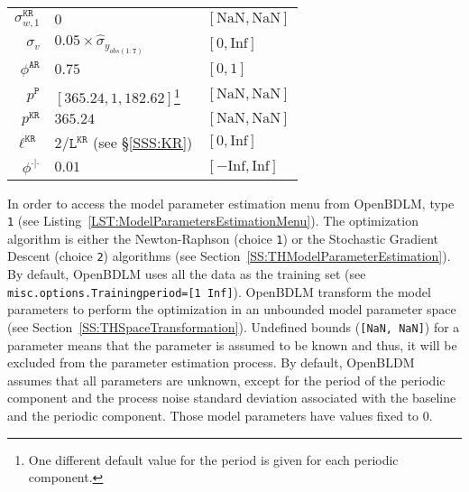 \begin{table}[h!]
\begin{tabular}{r|ll}
$\sigma_{w,1}^{\mathtt{KR}}  $ &  $0$  &  $[\text{NaN},\text{NaN}]$ \\
$\sigma_{v}$ &  $0.05\times\hat{\sigma}_{y_{obs(1:\mathtt{T})}}$  &  $[0,\text{Inf}]$ \\
$\phi^{\mathtt{AR}} $ &  $0.75$ & $[0,1]$ \\
$p^{\mathtt{P}} $ &  $[365.24, 1, 182.62]$\footnote{One different default value for the period is given for each periodic component.} & $[\text{NaN},\text{NaN}]$ \\
$p^{\mathtt{KR}} $ &  $365.24$ & $[\text{NaN},\text{NaN}]$ \\
$\ell^{\mathtt{KR}} $ &  $2/\mathtt{L}^{\mathtt{KR}}$ (see \S\ref{SSS:KR})& $[0,\text{Inf}]$ \\
$\phi^{\cdot|\cdot} $ &  $0.01$  &  $[-\text{Inf}, \text{Inf}]$\\\hline
\end{tabular}
\label{table:defaultparamreal}
\end{table}



In order to access the model parameter estimation menu from OpenBDLM, type  \colorbox{light-gray}{\lstinline[basicstyle = \mlttfamily \small, backgroundcolor = \color{light-gray}]!1!} (see Listing~\ref{LST:ModelParametersEstimationMenu}).
The optimization algorithm is either the Newton-Raphson (choice \colorbox{light-gray}{\lstinline[basicstyle = \mlttfamily \small, backgroundcolor = \color{light-gray}]!1!}) or the Stochastic Gradient Descent  (choice \colorbox{light-gray}{\lstinline[basicstyle = \mlttfamily \small, backgroundcolor = \color{light-gray}]!2!}) algorithms (see Section~\ref{SS:THModelParameterEstimation}).
By default, OpenBDLM uses all the data as the training set (see \lstinline[basicstyle = \mlttfamily \small ]!misc.options.Trainingperiod=[1 Inf]!).
OpenBDLM transform the model parameters to perform the optimization in an unbounded model parameter space (see Section~\ref{SS:THSpaceTransformation}).
Undefined bounds (\lstinline[basicstyle = \mlttfamily \small ]![NaN, NaN]!)  for a parameter means that the parameter is assumed to be known and thus, it will be excluded from the parameter estimation process.
By default, OpenBLDM assumes that all parameters are unknown, except for the period of the periodic component and the process noise standard deviation associated with the baseline and the periodic component.
Those model parameters have values fixed to 0.\\

